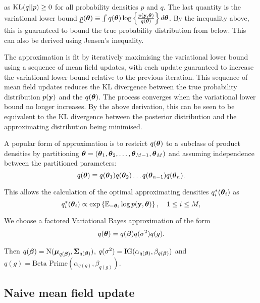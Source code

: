 \documentclass{amsart}[12pt]
\begin{document}
\noindent as $\text{KL}(q||p) \geq 0$ for all probability densities $p$ and $q$. The last quantity is the
variational lower bound $\underline{p}({\boldsymbol \theta}) \equiv \int q({\boldsymbol \theta}) \log\left\{ \frac{p({\bf y},
{\boldsymbol \theta})}{q({\boldsymbol \theta})} \right\} d{\boldsymbol \theta}$. By the inequality above, this is guaranteed to bound the true
probability distribution from below. This can also be derived using Jensen's inequality.

The approximation is fit by iteratively maximising the variational lower bound using a sequence of mean field
updates, with each update guaranteed to increase the variational lower bound relative to the previous
iteration. This sequence of mean field updates reduces the KL divergence between the true probability
distribution $p({\bf y})$ and the $q({\boldsymbol \theta})$. The process converges when the variational lower bound no longer
increases. By the above derivation, this can be seen to be equivalent to the KL divergence between the posterior distribution and the approximating distribution being minimised.

A popular form of approximation is to restrict $q({\boldsymbol \theta})$ to a subclass of product densities by partitioning
${\boldsymbol \theta} = ({\boldsymbol \theta}_1, {\boldsymbol \theta}_2, \ldots, {\boldsymbol \theta}_{M-1}, {\boldsymbol \theta}_M)$ and assuming independence between the
partitioned parameters:
\begin{equation*}
	q({\boldsymbol \theta}) \equiv q({\boldsymbol \theta}_1) q({\boldsymbol \theta}_2) \ldots q({\boldsymbol \theta}_{n-1}) q({\boldsymbol \theta}_n).
\end{equation*}

\noindent This allows the calculation of the optimal approximating densities $q_i^*({\boldsymbol \theta}_i)$ as
\begin{equation*}
	q_i^*({\boldsymbol \theta}_i) \propto \exp \left \{ \mathbb{E}_{-{\boldsymbol \theta}_i} \log p({\bf y}, {\boldsymbol \theta}) \right \}, \quad 1 \leq i \leq M,
\end{equation*}

We choose a factored Variational Bayes approximation of the form
\begin{align*}
	q({\boldsymbol \theta}) = q({\boldsymbol \beta}) q(\sigma^2) q(g). 
\end{align*}

\noindent Then $q({\boldsymbol \beta}) = \text{N}({\boldsymbol \mu}_{q({\boldsymbol \beta})}, {\boldsymbol \Sigma}_{q({\boldsymbol \beta})})$, $q(\sigma^2) = \text{IG}(\alpha_{q({\boldsymbol \beta})}, \beta_{q({\boldsymbol \beta})})$ and $q(g) = \text{Beta Prime}(\alpha_{q(g)}, \beta_{q(g)})$.

\subsection{Naive mean field update}
\label{sec:naive_mean_field_updates}
\end{document}
